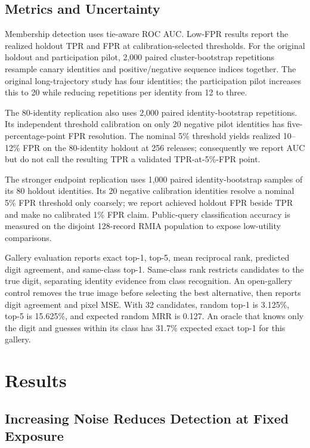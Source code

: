 \documentclass[conference]{IEEEtran}
\begin{document}
\subsection{Metrics and Uncertainty}

Membership detection uses tie-aware ROC AUC. Low-FPR results report the realized holdout TPR and FPR at calibration-selected thresholds. For the original holdout and participation pilot, 2,000 paired cluster-bootstrap repetitions resample canary identities and positive/negative sequence indices together. The original long-trajectory study has four identities; the participation pilot increases this to 20 while reducing repetitions per identity from 12 to three.

The 80-identity replication also uses 2,000 paired identity-bootstrap repetitions. Its independent threshold calibration on only 20 negative pilot identities has five-percentage-point FPR resolution. The nominal 5\% threshold yields realized 10--12\% FPR on the 80-identity holdout at 256 releases; consequently we report AUC but do not call the resulting TPR a validated TPR-at-5\%-FPR point.

The stronger endpoint replication uses 1,000 paired identity-bootstrap samples of its 80 holdout identities. Its 20 negative calibration identities resolve a nominal 5\% FPR threshold only coarsely; we report achieved holdout FPR beside TPR and make no calibrated 1\% FPR claim. Public-query classification accuracy is measured on the disjoint 128-record RMIA population to expose low-utility comparisons.

Gallery evaluation reports exact top-1, top-5, mean reciprocal rank, predicted digit agreement, and same-class top-1. Same-class rank restricts candidates to the true digit, separating identity evidence from class recognition. An open-gallery control removes the true image before selecting the best alternative, then reports digit agreement and pixel MSE. With 32 candidates, random top-1 is 3.125\%, top-5 is 15.625\%, and expected random MRR is 0.127. An oracle that knows only the digit and guesses within its class has 31.7\% expected exact top-1 for this gallery.

\section{Results}

\subsection{Increasing Noise Reduces Detection at Fixed Exposure}
\end{document}
